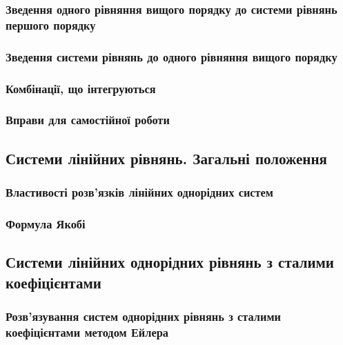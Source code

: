 		\subsubsection{Зведення одного рівняння вищого порядку до системи рівнянь першого порядку}
		

		\subsubsection{Зведення системи рівнянь до одного рівняння вищого порядку}
		

		\subsubsection{Комбінації, що інтегруються}
		

		\subsubsection{Вправи для самостійної роботи}
		

	\subsection{Системи лінійних рівнянь. Загальні положення}
	

		\subsubsection{Властивості розв'язків лінійних однорідних систем}
		

		\subsubsection{Формула Якобі}
		

	\subsection{Системи лінійних однорідних рівнянь з сталими коефіцієнтами}
	

		\subsubsection{Розв'язування систем однорідних рівнянь з сталими коефіцієнтами методом Ейлера}
		

